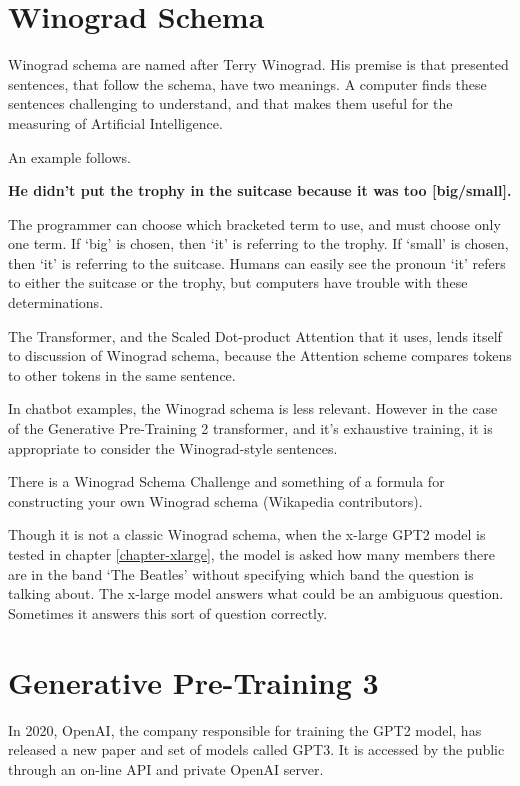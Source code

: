 \section{Winograd Schema}

Winograd schema are named after Terry Winograd. His premise is that presented sentences, that follow the schema, have two meanings. A computer finds these sentences challenging to understand, and that makes them useful for the measuring of Artificial Intelligence.

An example follows.

\begin{center}
	\textbf{He didn't put the trophy in the suitcase because it was too [big/small].}
\end{center}

The programmer can choose which bracketed term to use, and must choose only one term. If `big' is chosen, then `it' is referring to the trophy. If `small' is chosen, then `it' is referring to the suitcase. Humans can easily see the pronoun `it' refers to either the suitcase or the trophy, but computers have trouble with these determinations.

The Transformer, and the Scaled Dot-product Attention that it uses, lends itself to discussion of Winograd schema, because the Attention scheme compares tokens to other tokens in the same sentence. 

In chatbot examples, the Winograd schema is less relevant. %
However in the case of the Generative Pre-Training 2 transformer, and it's exhaustive training, it is appropriate to consider the Winograd-style sentences.

There is a Winograd Schema Challenge and something of a formula for constructing your own Winograd schema (Wikapedia contributors). \cite{wiki:xxx}

Though it is not a classic Winograd schema, when the x-large GPT2 model is tested in chapter \ref{chapter-xlarge}, the model is asked how many members there are in the band `The Beatles' without specifying which band the question is talking about. The x-large model answers what could be an ambiguous question. Sometimes it answers this sort of question correctly.

\section{Generative Pre-Training 3}

In 2020, OpenAI, the company responsible for training the GPT2 model, has released a new paper and set of models called GPT3. It is accessed by the public through an on-line API and private OpenAI server.

